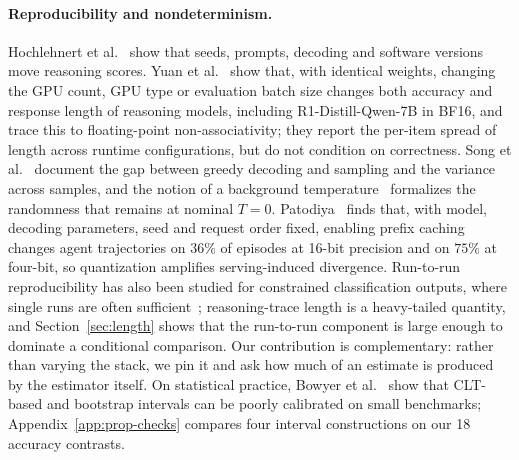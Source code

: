 \documentclass[11pt,a4paper]{article}
\begin{document}
\paragraph{Reproducibility and nondeterminism.} Hochlehnert et al.~\cite{hochlehnert2025sober} show that seeds, prompts, decoding and software versions move reasoning scores. Yuan et al.~\cite{yuan2025nondeterminism} show that, with identical weights, changing the GPU count, GPU type or evaluation batch size changes both accuracy and response length of reasoning models, including R1-Distill-Qwen-7B in BF16, and trace this to floating-point non-associativity; they report the per-item spread of length across runtime configurations, but do not condition on correctness. Song et al.~\cite{song2025greedy} document the gap between greedy decoding and sampling and the variance across samples, and the notion of a background temperature~\cite{messina2026backgroundtemp} formalizes the randomness that remains at nominal $T=0$. Patodiya~\cite{patodiya2026cache} finds that, with model, decoding parameters, seed and request order fixed, enabling prefix caching changes agent trajectories on $36\%$ of episodes at 16-bit precision and on $75\%$ at four-bit, so quantization amplifies serving-induced divergence. Run-to-run reproducibility has also been studied for constrained classification outputs, where single runs are often sufficient~\cite{windisch2026onerun}; reasoning-trace length is a heavy-tailed quantity, and Section~\ref{sec:length} shows that the run-to-run component is large enough to dominate a conditional comparison. Our contribution is complementary: rather than varying the stack, we pin it and ask how much of an estimate is produced by the estimator itself. On statistical practice, Bowyer et al.~\cite{bowyer2025clt} show that CLT-based and bootstrap intervals can be poorly calibrated on small benchmarks; Appendix~\ref{app:prop-checks} compares four interval constructions on our 18 accuracy contrasts.
\end{document}
